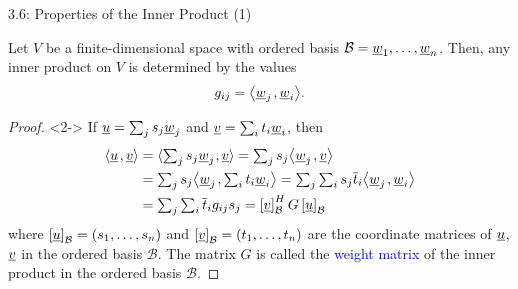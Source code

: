 \documentclass[10pt,english,aspectratio=169]{beamer}
\begin{document}
\begin{frame}{3.6: Properties of the Inner Product (1)}

\vspace{-1.5mm}

\begin{theorem}
Let $V$ be a finite-dimensional space with ordered basis $\mathcal{B} = \underline{w}_1, \ldots, \underline{w}_n$.
Then, any inner product on $V$ is determined by the values \vspace{-1,5mm}
\begin{equation*}
g_{ij} = {\left\langle  \underline{w}_j  \mskip2mu ,  \underline{w}_i  \right\rangle}.
\end{equation*}
\end{theorem}

\begin{proof}<2->
If $\underline{u} = \sum_{j} s_j \underline{w}_j$ and $\underline{v} = \sum_{i} t_i \underline{w}_i$, then \vspace{-1.5mm}
\begin{equation*}
\begin{split}
{\left\langle  \underline{u}  \mskip2mu ,  \underline{v}  \right\rangle}
&= {\langle  \textstyle\sum_{j} s_j \underline{w}_j  \mskip1mu ,  \underline{v}  \rangle}
= \textstyle\sum_{j} s_j {\left\langle  \underline{w}_j  \mskip2mu ,  \underline{v}  \right\rangle} \\
&= \textstyle\sum_{j} s_j {\left\langle  \underline{w}_j  \mskip2mu ,  \textstyle\sum_{i} t_i \underline{w}_i  \right\rangle}
= \textstyle\sum_{j} \textstyle\sum_{i} s_j \overline{t}_i {\left\langle  \underline{w}_j  \mskip2mu ,  \underline{w}_i  \right\rangle} \\
&= \textstyle\sum_{j} \textstyle\sum_{i} \overline{t}_i g_{ij} s_j
= \left[ \underline{v} \right]_{\mathcal{B}}^H G \left[ \underline{u} \right]_{\mathcal{B}}
\end{split}
\end{equation*}
where $\left[ \underline{u} \right]_{\mathcal{B}} = (s_1,\ldots,s_n)$ and $\left[ \underline{v} \right]_{\mathcal{B}} = (t_1,\ldots,t_n)$ are the coordinate matrices of $\underline{u}$, $\underline{v}$ in the ordered basis $\mathcal{B}$.
The matrix $G$ is called the \textcolor{blue}{weight matrix} of the inner product in the ordered basis $\mathcal{B}$.
\end{proof}

\end{frame}
\end{document}
